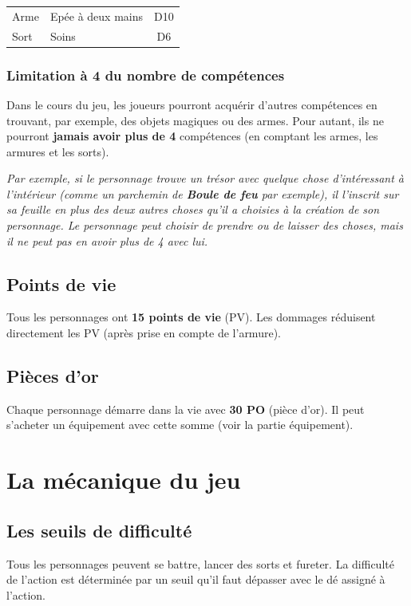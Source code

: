 \documentclass[a4paper, 11pt, twoside]{article}
\begin{document}
\begin{longtable}{l|l|c}
\hline
Arme & Epée à deux mains & D10\\
Sort & Soins & D6\\
\end{longtable}

\subsubsection{Limitation à 4 du nombre de compétences}
\label{sec:orge8d1c6d}

Dans le cours du jeu, les joueurs pourront acquérir d'autres compétences en trouvant, par exemple, des objets magiques ou des armes. Pour autant, ils ne pourront \textbf{jamais avoir plus de 4} compétences (en comptant les armes, les armures et les sorts).

\emph{Par exemple, si le personnage trouve un trésor avec quelque chose d'intéressant à l'intérieur (comme un parchemin de \textbf{Boule de feu} par exemple), il l'inscrit sur sa feuille en plus des deux autres choses qu'il a choisies à la création de son personnage. Le personnage peut choisir de prendre ou de laisser des choses, mais il ne peut pas en avoir plus de 4 avec lui.}

\subsection{Points de vie}
\label{sec:orga0c9b3a}

Tous les personnages ont \textbf{15 points de vie} (PV). Les dommages réduisent directement les PV (après prise en compte de l'armure).

\subsection{Pièces d'or}
\label{sec:org044e055}

Chaque personnage démarre dans la vie avec \textbf{30 PO} (pièce d'or). Il peut s'acheter un équipement avec cette somme (voir la partie équipement).

\section{La mécanique du jeu}
\label{sec:orgf18f17b}
\subsection{Les seuils de difficulté}
\label{sec:org59458ee}
Tous les personnages peuvent se battre, lancer des sorts et fureter. La difficulté de l'action est déterminée par un seuil qu'il faut dépasser avec le dé assigné à l'action.
\end{document}
